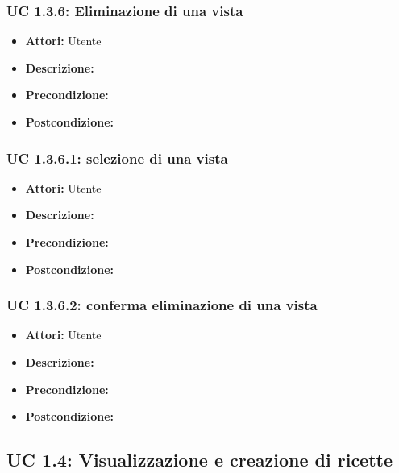 \subsubsection{UC 1.3.6: Eliminazione di una vista}

\begin{itemize}
\item \textbf{Attori:} Utente
\item \textbf{Descrizione:} 
\item \textbf{Precondizione:} 
\item \textbf{Postcondizione:} 
\end{itemize}

\subsubsection{UC 1.3.6.1: selezione di una vista}

\begin{itemize}
\item \textbf{Attori:} Utente
\item \textbf{Descrizione:} 
\item \textbf{Precondizione:} 
\item \textbf{Postcondizione:} 
\end{itemize}

\subsubsection{UC 1.3.6.2: conferma eliminazione di una vista}

\begin{itemize}
\item \textbf{Attori:} Utente
\item \textbf{Descrizione:} 
\item \textbf{Precondizione:} 
\item \textbf{Postcondizione:} 
\end{itemize}



\subsection{UC 1.4: Visualizzazione e creazione di ricette}

